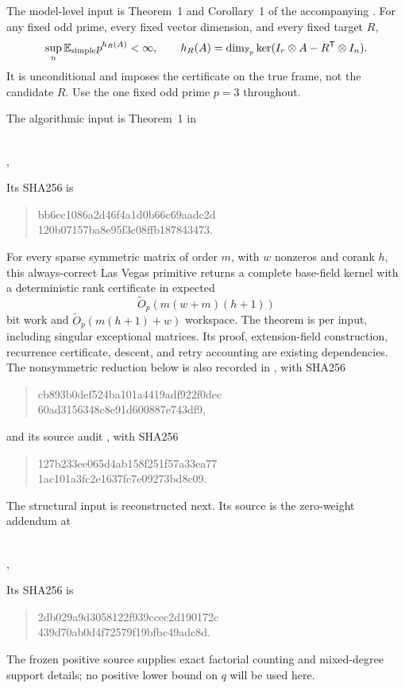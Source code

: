 \documentclass[11pt]{article}
\newcommand{\E}{\mathbb E}
\newcommand{\Fp}{\mathbb F_p}
\begin{document}
The model-level input is Theorem~1 and Corollary~1 of the accompanying . For any fixed odd prime, every fixed vector dimension, and every fixed target $R$,
\begin{equation}\label{eq:moment}
 \sup_n\E_{\rm simple}p^{h_R(A)}<\infty,\qquad
 h_R(A)=\dim_{\Fp}\ker(I_r\otimes A-R^{\mathsf T}\otimes I_n).
\end{equation}
It is unconditional and imposes the certificate on the true frame, not the candidate $R$. Use the one fixed odd prime $p=3$ throughout.

The algorithmic input is Theorem~1 in
\begin{center}\small
{}\\
,
\end{center}
Its SHA256 is
\begin{quote}\small\ttfamily
bb6ec1086a2d46f4a1d0b66c69aadc2d\\
120b07157ba8e95f3c08ffb187843473.
\end{quote}
For every sparse symmetric matrix of order $m$, with $w$ nonzeros and corank $h$, this always-correct Las Vegas primitive returns a complete base-field kernel with a deterministic rank certificate in expected
\[
 \widetilde O_p(m(w+m)(h+1))
\]
bit work and $\widetilde O_p(m(h+1)+w)$ workspace. The theorem is per input, including singular exceptional matrices. Its proof, extension-field construction, recurrence certificate, descent, and retry accounting are existing dependencies. The nonsymmetric reduction below is also recorded in , with SHA256
\begin{quote}\small\ttfamily
cb893b0def524ba101a4419adf922f0dec\\
60ad3156348c8e91d600887e743df9,
\end{quote}
and its source audit , with SHA256
\begin{quote}\small\ttfamily
127b233ee065d4ab158f251f57a33ea77\\
1ac101a3fc2e1637fc7e09273bd8c09.
\end{quote}

The structural input is reconstructed next. Its source is the zero-weight addendum at
\begin{center}\small
{}\\
,
\end{center}
Its SHA256 is
\begin{quote}\small\ttfamily
2db029a9d3058122f939ccec2d190172c\\
439d70ab0d4f72579f19bfbc49adc8d.
\end{quote}
The frozen positive source supplies exact factorial counting and mixed-degree support details; no positive lower bound on $q$ will be used here.
\end{document}
